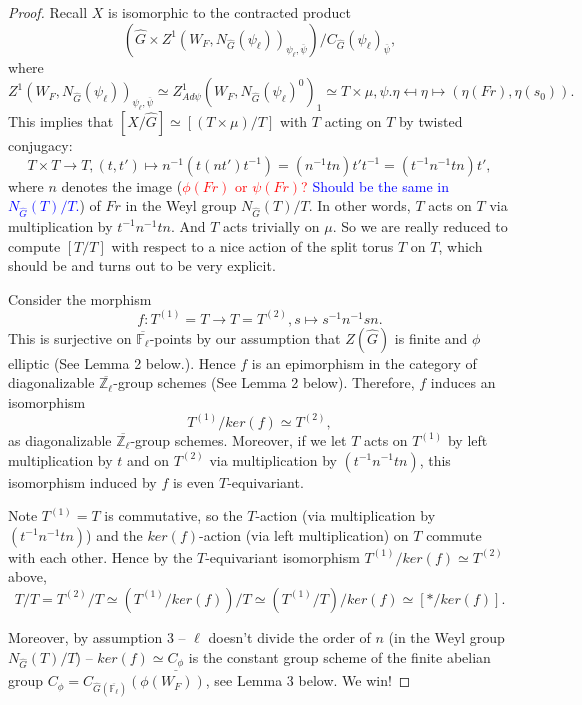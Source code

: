 \documentclass{article}
\newcommand{\red}[1]{\textcolor{red}{#1}}
\newcommand{\blue}[1]{\textcolor{blue}{#1}}
\begin{document}
	\begin{proof}
		Recall $X$ is isomorphic to the contracted product 
		$$(\hat{G} \times Z^1(W_F, N_{\hat{G}}(\psi_{\ell}))_{\psi_{\ell}, \overline{\psi}})/C_{\hat{G}}(\psi_{\ell})_{\overline{\psi}},$$ 
		where
		$$Z^1(W_F, N_{\hat{G}}(\psi_{\ell}))_{\psi_{\ell}, \overline{\psi}} \simeq Z^1_{Ad\psi}(W_F, N_{\hat{G}}(\psi_{\ell})^0)_1 \simeq T \times \mu, \psi.\eta \mapsfrom \eta \mapsto (\eta(Fr), \eta(s_0)).$$
		This implies that $[X/\hat{G}] \simeq [(T \times \mu)/T]$ with $T$ acting on $T$ by twisted conjugacy:
		$$T \times T \to T, (t, t') \mapsto n^{-1}(t(nt')t^{-1})=(n^{-1}tn)t't^{-1}=(t^{-1}n^{-1}tn)t',$$ where $n$ denotes the image (\red{$\phi(Fr)$ or $\psi(Fr)$?} \blue{Should be the same in $N_{\hat{G}}(T)/T$.})
		of $Fr$ in the Weyl group $N_{\hat{G}}(T)/T$.
		In other words, $T$ acts on $T$ via multiplication by $t^{-1}n^{-1}tn$. And $T$ acts trivially on $\mu$. So we are really reduced to compute $[T/T]$ with respect to a nice action of the split torus $T$ on $T$, which should be and turns out to be very explicit.
		
		Consider the morphism
		$$f: T^{(1)}=T \to T=T^{(2)}, s \mapsto s^{-1}n^{-1}sn.$$
		This is surjective on $\overline{\mathbb{F}_{\ell}}$-points by our assumption that $Z(\hat{G})$ is finite and $\phi$ elliptic (See Lemma 2 %
		below.). Hence $f$ is an epimorphism in the category of diagonalizable $\overline{\mathbb{Z}_{\ell}}$-group schemes (See Lemma 2 %
		below). Therefore, $f$ induces an isomorphism 
		$$T^{(1)}/ker(f) \simeq T^{(2)},$$
		as diagonalizable $\overline{\mathbb{Z}_{\ell}}$-group schemes. Moreover, if we let $T$ acts on $T^{(1)}$ by left multiplication by $t$ and on $T^{(2)}$ via multiplication by $(t^{-1}n^{-1}tn)$, this isomorphism induced by $f$ is even $T$-equivariant.
		
		Note $T^{(1)}=T$ is commutative, so the $T$-action (via multiplication by $(t^{-1}n^{-1}tn)$) and the $ker(f)$-action (via left multiplication) on $T$ commute with each other. Hence by the $T$-equivariant isomorphism $T^{(1)}/ker(f) \simeq T^{(2)}$ above,
		$$T/T = T^{(2)}/T \simeq (T^{(1)}/ker(f))/T \simeq (T^{(1)}/T)/ker(f) \simeq [*/ker(f)].$$ 
		
		Moreover, by assumption 3 --  $\ell$ doesn't divide the order of $n$ (in the Weyl group $N_{\hat{G}}(T)/T$) -- $ker(f) \simeq \underline{C_{\phi}}$ is the constant group scheme of the finite abelian group $C_{\phi}=C_{\hat{G}(\overline{\mathbb{F}_{\ell}})}(\phi(W_F))$, see Lemma 3 below. %
		We win!
	\end{proof}
	
\end{document}
